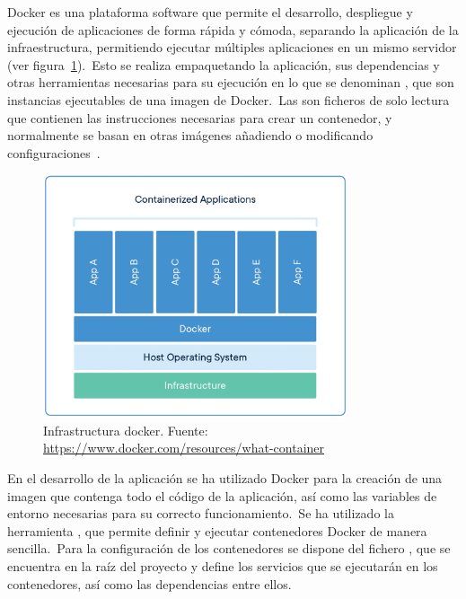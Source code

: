 
Docker es una plataforma software que permite el desarrollo, despliegue y ejecución de aplicaciones de forma rápida y
cómoda, separando la aplicación de la infraestructura, permitiendo ejecutar múltiples aplicaciones en un mismo servidor
(ver figura~\ref{fig:docker-container-infrastructure}).\ Esto se realiza empaquetando la
aplicación, sus dependencias y otras herramientas necesarias para su ejecución en lo que se denominan
, que son instancias ejecutables de una imagen de Docker.\ Las  son
ficheros de solo lectura que contienen las instrucciones necesarias para crear un contenedor, y normalmente se basan
en otras imágenes añadiendo o modificando configuraciones~\cite{docker-docs}.

\begin{figure}[ht]
	\centering
	\includegraphics[width=0.8\textwidth]{res/images/container-what-is-container}
	\caption{Infrastructura docker. Fuente: \url{https://www.docker.com/resources/what-container}}
	\label{fig:docker-container-infrastructure}
\end{figure}

En el desarrollo de la aplicación se ha utilizado Docker para la creación de una imagen que contenga todo el código de
la aplicación, así como las variables de entorno necesarias para su correcto funcionamiento.\ Se ha
utilizado la herramienta , que permite definir y ejecutar contenedores Docker de manera
sencilla.\ Para la configuración de los contenedores se dispone del fichero , que se
encuentra en la raíz del proyecto y define los servicios que se ejecutarán en los contenedores, así como
las dependencias entre ellos.

